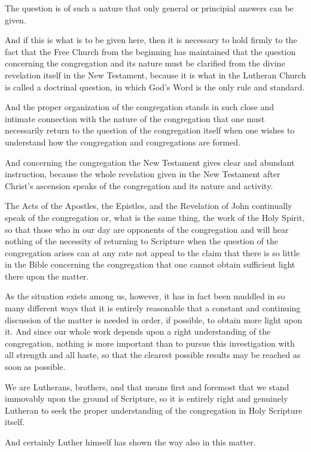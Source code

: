 The question is of such a nature that only general or principial answers can be given.

And if this is what is to be given here, then it is necessary to hold firmly to the fact that the Free Church from the beginning has maintained that the question concerning the congregation and its nature must be clarified from the divine revelation itself in the New Testament, because it is what in the Lutheran Church is called a doctrinal question, in which God’s Word is the only rule and standard.

And the proper organization of the congregation stands in such close and intimate connection with the nature of the congregation that one must necessarily return to the question of the congregation itself when one wishes to understand how the congregation and congregations are formed.

And concerning the congregation the New Testament gives clear and abundant instruction, because the whole revelation given in the New Testament after Christ’s ascension speaks of the congregation and its nature and activity.

The Acts of the Apostles, the Epistles, and the Revelation of John continually speak of the congregation or, what is the same thing, the work of the Holy Spirit, so that those who in our day are opponents of the congregation and will hear nothing of the necessity of returning to Scripture when the question of the congregation arises can at any rate not appeal to the claim that there is so little in the Bible concerning the congregation that one cannot obtain sufficient light there upon the matter.

As the situation exists among us, however, it has in fact been muddled in so many different ways that it is entirely reasonable that a constant and continuing discussion of the matter is needed in order, if possible, to obtain more light upon it. And since our whole work depends upon a right understanding of the congregation, nothing is more important than to pursue this investigation with all strength and all haste, so that the clearest possible results may be reached as soon as possible.

We are Lutherans, brothers, and that means first and foremost that we stand immovably upon the ground of Scripture, so it is entirely right and genuinely Lutheran to seek the proper understanding of the congregation in Holy Scripture itself.

And certainly Luther himself has shown the way also in this matter.

